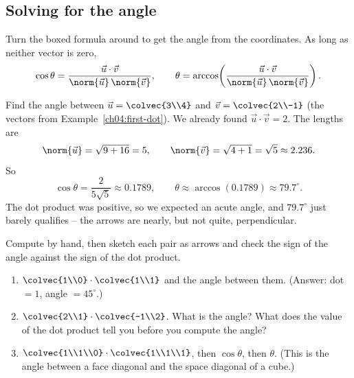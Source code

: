 \subsection{Solving for the angle}

Turn the boxed formula around to get the angle from the coordinates. As long as
neither vector is zero,
\[
  \cos\theta = \frac{\vec u\cdot\vec v}{\norm{\vec u}\,\norm{\vec v}},
  \qquad
  \theta = \arccos\!\left(\frac{\vec u\cdot\vec v}
                                {\norm{\vec u}\,\norm{\vec v}}\right).
\]

\begin{example}\label{ch04:angle-ex}
Find the angle between $\vec u = \colvec{3\\4}$ and $\vec v = \colvec{2\\-1}$
(the vectors from Example~\ref{ch04:first-dot}). We already found
$\vec u\cdot\vec v = 2$. The lengths are
\[
  \norm{\vec u} = \sqrt{9+16} = 5, \qquad
  \norm{\vec v} = \sqrt{4+1} = \sqrt5 \approx 2.236.
\]
So
\[
  \cos\theta = \frac{2}{5\sqrt5} \approx 0.1789,
  \qquad
  \theta \approx \arccos(0.1789) \approx 79.7^\circ.
\]
The dot product was positive, so we expected an acute angle, and $79.7^\circ$
just barely qualifies -- the arrows are nearly, but not quite, perpendicular.
\end{example}

\begin{labbox}
Compute by hand, then sketch each pair as arrows and check the sign of the angle
against the sign of the dot product.
\begin{enumerate}
  \item $\colvec{1\\0}\cdot\colvec{1\\1}$ and the angle between them.
        (Answer: dot $=1$, angle $=45^\circ$.)
  \item $\colvec{2\\1}\cdot\colvec{-1\\2}$. What is the angle? What does the
        value of the dot product tell you before you compute the angle?
  \item $\colvec{1\\1\\0}\cdot\colvec{1\\1\\1}$, then $\cos\theta$, then $\theta$.
        (This is the angle between a face diagonal and the space diagonal of a
        cube.)
\end{enumerate}
\end{labbox}

